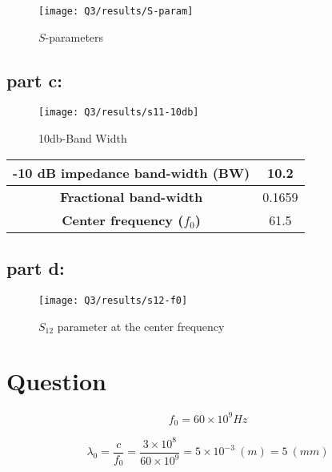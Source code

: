 \documentclass[12pt,onecolumn,a4paper]{article}
\newcommand\question{
	\section{Question \numberstringnum{\thesection}}
}
\begin{document}
	
	
	\begin{figure}[H]
	\centering
	\texttt{[image: Q3/results/S-param]}
	\caption{$S$-parameters}
	\label{fig:S-param}
	\end{figure}


	
	\FloatBarrier
	\subsection{part c:}
	
	
	\begin{figure}[H]
		\centering
		\texttt{[image: Q3/results/s11-10db]}
		\caption{10db-Band Width}
		\label{fig:s11-10db}
	\end{figure}
	
	\begin{table}[H]
		\centering
		\begin{tabular}{cc}
			\toprule
			\textbf{-10 dB impedance band-width (BW)} & 10.2 \\ \midrule		
			\textbf{Fractional band-width} & 0.1659 \\ \midrule
			\textbf{Center frequency ($f_0$)}                & 61.5   \\ 
			\bottomrule
		\end{tabular}
	\end{table}
	
	
	\FloatBarrier
	\subsection{part d:}
	
	
		\begin{figure}[H]
		\centering
		\texttt{[image: Q3/results/s12-f0]}
		\caption{$S_{12}$ parameter at the center frequency}
		\label{fig:s12-f0}
	\end{figure}
	
	\FloatBarrier
	\question%
	

	\begin{equation}
		f_0 = 60 \times 10^9 Hz
	\end{equation}
	
	\begin{equation}
		\lambda_0 = \frac{c}{f_0} = \frac{3 \times 10^8}{60 \times 10^9} = 5 \times 10^{-3}\ (m) = 5\ (mm)
	\end{equation}
	
\end{document}
